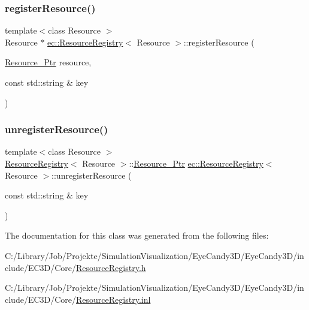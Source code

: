 \subsubsection{\texorpdfstring{register\+Resource()}{registerResource()}}
{\footnotesize\ttfamily template$<$class Resource $>$ \\
Resource $\ast$ \mbox{\hyperlink{classec_1_1_resource_registry}{ec\+::\+Resource\+Registry}}$<$ Resource $>$\+::register\+Resource (\begin{DoxyParamCaption}\item[{\mbox{\hyperlink{classec_1_1_resource_registry_a77cf5381229bff47d251603c783115fe}{Resource\+\_\+\+Ptr}}}]{resource,  }\item[{const std\+::string \&}]{key }\end{DoxyParamCaption})}

\mbox{\label{classec_1_1_resource_registry_ae1227f72ea04032d4e757ac4b5b0845a}} 
\subsubsection{\texorpdfstring{unregister\+Resource()}{unregisterResource()}}
{\footnotesize\ttfamily template$<$class Resource $>$ \\
\mbox{\hyperlink{classec_1_1_resource_registry}{Resource\+Registry}}$<$ Resource $>$\+::\mbox{\hyperlink{classec_1_1_resource_registry_a77cf5381229bff47d251603c783115fe}{Resource\+\_\+\+Ptr}} \mbox{\hyperlink{classec_1_1_resource_registry}{ec\+::\+Resource\+Registry}}$<$ Resource $>$\+::unregister\+Resource (\begin{DoxyParamCaption}\item[{const std\+::string \&}]{key }\end{DoxyParamCaption})}



The documentation for this class was generated from the following files\+:\begin{DoxyCompactItemize}
\item 
C\+:/\+Library/\+Job/\+Projekte/\+Simulation\+Visualization/\+Eye\+Candy3\+D/\+Eye\+Candy3\+D/include/\+E\+C3\+D/\+Core/\mbox{\hyperlink{_resource_registry_8h}{Resource\+Registry.\+h}}\item 
C\+:/\+Library/\+Job/\+Projekte/\+Simulation\+Visualization/\+Eye\+Candy3\+D/\+Eye\+Candy3\+D/include/\+E\+C3\+D/\+Core/\mbox{\hyperlink{_resource_registry_8inl}{Resource\+Registry.\+inl}}\end{DoxyCompactItemize}
